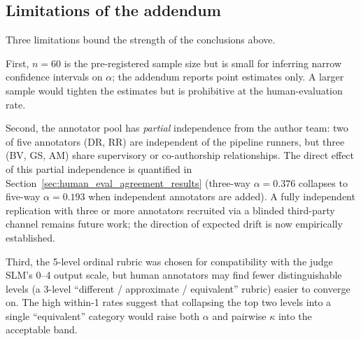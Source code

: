 \subsection{Limitations of the addendum}
\label{sec:human_eval_limitations}

Three limitations bound the strength of the conclusions above.

First, $n = 60$ is the pre-registered sample size but is small for
inferring narrow confidence intervals on $\alpha$; the addendum reports
point estimates only. A larger sample would tighten the estimates but is
prohibitive at the human-evaluation rate.

Second, the annotator pool has \emph{partial} independence from the
author team: two of five annotators (DR, RR) are independent of the
pipeline runners, but three (BV, GS, AM) share supervisory or
co-authorship relationships. The direct effect of this partial
independence is quantified in Section~\ref{sec:human_eval_agreement_results}
(three-way $\alpha = 0.376$ collapses to five-way $\alpha = 0.193$ when
independent annotators are added). A fully independent replication with
three or more annotators recruited via a blinded third-party channel
remains future work; the direction of expected drift is now empirically
established.

Third, the 5-level ordinal rubric was chosen for compatibility with the
judge SLM's 0--4 output scale, but human annotators may find fewer
distinguishable levels (a 3-level ``different / approximate / equivalent''
rubric) easier to converge on. The high within-1 rates suggest that
collapsing the top two levels into a single ``equivalent'' category
would raise both $\alpha$ and pairwise $\kappa$ into the acceptable
band.
